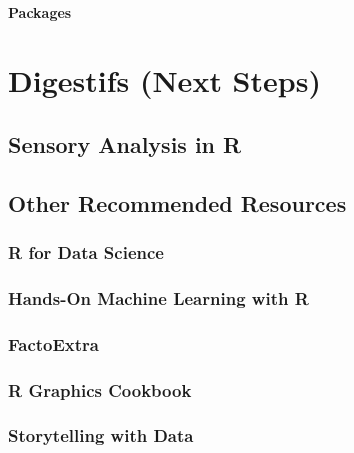 \documentclass[
]{book}
\begin{document}
\hypertarget{packages}{%
\subsubsection{Packages}\label{packages}}

\hypertarget{next-steps}{%
\chapter{Digestifs (Next Steps)}\label{next-steps}}

\hypertarget{sensory-analysis-in-r}{%
\section{Sensory Analysis in R}\label{sensory-analysis-in-r}}

\hypertarget{other-recommended-resources}{%
\section{Other Recommended Resources}\label{other-recommended-resources}}

\hypertarget{r-for-data-science}{%
\subsection{R for Data Science}\label{r-for-data-science}}

\hypertarget{hands-on-machine-learning-with-r}{%
\subsection{Hands-On Machine Learning with R}\label{hands-on-machine-learning-with-r}}

\hypertarget{factoextra}{%
\subsection{FactoExtra}\label{factoextra}}

\hypertarget{r-graphics-cookbook}{%
\subsection{R Graphics Cookbook}\label{r-graphics-cookbook}}

\hypertarget{storytelling-with-data}{%
\subsection{Storytelling with Data}\label{storytelling-with-data}}
\end{document}
